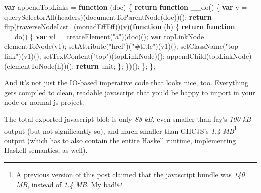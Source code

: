 \documentclass[]{article}
\newenvironment{Shaded}{}{}
\newcommand{\KeywordTok}[1]{\textcolor[rgb]{0.00,0.44,0.13}{\textbf{{#1}}}}
\newcommand{\StringTok}[1]{\textcolor[rgb]{0.25,0.44,0.63}{{#1}}}
\newcommand{\ControlFlowTok}[1]{\textcolor[rgb]{0.00,0.44,0.13}{\textbf{{#1}}}}
\newcommand{\OperatorTok}[1]{\textcolor[rgb]{0.40,0.40,0.40}{{#1}}}
\newcommand{\AttributeTok}[1]{\textcolor[rgb]{0.49,0.56,0.16}{{#1}}}
\newcommand{\NormalTok}[1]{{#1}}
\begin{document}
\begin{Shaded}
\begin{Highlighting}[]
\KeywordTok{var} \NormalTok{appendTopLinks }\OperatorTok{=} \KeywordTok{function} \NormalTok{(doc) }\OperatorTok{\{}
    \ControlFlowTok{return} \KeywordTok{function} \AttributeTok{__do}\NormalTok{() }\OperatorTok{\{}
        \KeywordTok{var} \NormalTok{v }\OperatorTok{=} \AttributeTok{querySelectorAll}\NormalTok{(headers)(}\AttributeTok{documentToParentNode}\NormalTok{(doc))()}\OperatorTok{;}
        \ControlFlowTok{return} \AttributeTok{flip}\NormalTok{(}\AttributeTok{traverseNodeList_}\NormalTok{(monadEffEff))(v)(}\KeywordTok{function} \NormalTok{(h) }\OperatorTok{\{}
            \ControlFlowTok{return} \KeywordTok{function} \AttributeTok{__do}\NormalTok{() }\OperatorTok{\{}
                \KeywordTok{var} \NormalTok{v1 }\OperatorTok{=} \AttributeTok{createElement}\NormalTok{(}\StringTok{"a"}\NormalTok{)(doc)()}\OperatorTok{;}
                \KeywordTok{var} \NormalTok{topLinkNode }\OperatorTok{=} \AttributeTok{elementToNode}\NormalTok{(v1)}\OperatorTok{;}
                \AttributeTok{setAttribute}\NormalTok{(}\StringTok{"href"}\NormalTok{)(}\StringTok{"#title"}\NormalTok{)(v1)()}\OperatorTok{;}
                \AttributeTok{setClassName}\NormalTok{(}\StringTok{"top-link"}\NormalTok{)(v1)()}\OperatorTok{;}
                \AttributeTok{setTextContent}\NormalTok{(}\StringTok{"top"}\NormalTok{)(topLinkNode)()}\OperatorTok{;}
                \AttributeTok{appendChild}\NormalTok{(topLinkNode)(}\AttributeTok{elementToNode}\NormalTok{(h))()}\OperatorTok{;}
                \ControlFlowTok{return} \NormalTok{unit}\OperatorTok{;}
            \OperatorTok{\};}
        \OperatorTok{\}}\NormalTok{)()}\OperatorTok{;}
    \OperatorTok{\};}
\OperatorTok{\};}
\end{Highlighting}
\end{Shaded}

And it's not just the IO-based imperative code that looks nice, too.
Everything gets compiled to clean, readable javascript that you'd be
happy to import in your node or normal js project.

The total exported javascript blob is only \emph{88 kB}, even smaller
than fay's \emph{100 kB} output (but not significantly so), and much
smaller than GHCJS's \emph{1.4 MB}\footnote{A previous version of this
  post claimed that the javascript bundle was \emph{140 MB}, instead of
  \emph{1.4 MB}. My bad!} output (which has to also contain the entire
Haskell runtime, implementing Haskell semantics, as well).
\end{document}
